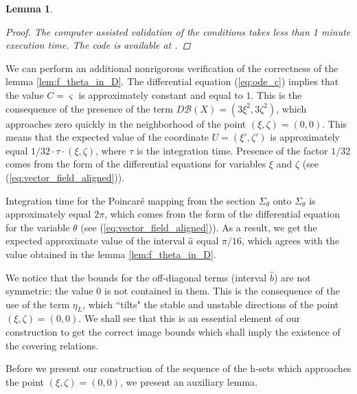 \documentclass[1p]{article}
\newtheorem{lemma}{Lemma}
\begin{document}
\begin{lemma}
\begin{proof}
        The computer assisted validation of the conditions takes less than 1 minute execution time. The code is available at \cite{pcr3bp_code}. 
    \end{proof}
\end{lemma}

We can perform an additional nonrigorous verification of the correctness of the lemma \ref{lem:f_theta_in_D}. The differential equation (\ref{eq:ode_c}) implies that the value $C = \varsigma$ is approximately constant and equal to $1$. This is the consequence of the presence of the term $D\mathcal{B}(X) = (3\xi^2, 3\zeta^2)$, which approaches zero quickly in the neighborhood of the point $(\xi,\zeta) = (0,0)$. This means that the expected value of the coordinate $U = (\xi', \zeta')$ is approximately equal $1/32 \cdot \tau \cdot (\xi,\zeta)$, where $\tau$ is the integration time. Presence of the factor $1/32$ comes from the form of the differential equations for variables $\xi$ and $\zeta$ (see (\ref{eq:vector_field_aligned})).

Integration time for the Poincar\'e mapping from the section $\Sigma_\theta$ onto $\Sigma_\theta$ is approximately equal $2\pi$, which comes from the form of the differential equation for the variable $\theta$ (see (\ref{eq:vector_field_aligned})). As a result, we get the expected approximate value of the interval $\hat{a}$ equal $\pi / 16$, which agrees with the value obtained in the lemma \ref{lem:f_theta_in_D}.

We notice that the bounds for the off-diagonal terms (interval $\hat{b}$) are not symmetric: the value $0$ is not contained in them. This is the consequence of the use of the term $\eta_{L}$, which ``tilts" the stable and unstable directions of the point $(\xi,\zeta) = (0,0)$. We shall see that this is an essential element of our construction to get the correct image bounds which shall imply the existence of the covering relations.

Before we present our construction of the sequence of the h-sets which approaches the point $(\xi,\zeta) = (0,0)$, we present an auxiliary lemma.
\end{document}
